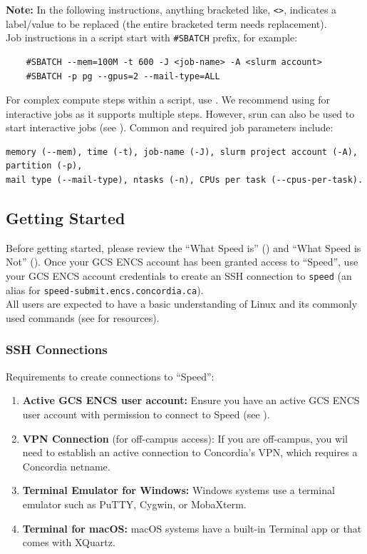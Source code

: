 \documentclass{easychair}
\begin{document}
\noindent \textbf{Note:} In the following instructions, anything bracketed like, \verb+<>+, indicates a
label/value to be replaced (the entire bracketed term needs replacement).\\

\noindent Job instructions in a script start with \verb+#SBATCH+ prefix, for example:
\begin{verbatim}
    #SBATCH --mem=100M -t 600 -J <job-name> -A <slurm account>
    #SBATCH -p pg --gpus=2 --mail-type=ALL
\end{verbatim}
%
For complex compute steps within a script, use . We recommend using  for interactive jobs as it supports multiple steps.
However, srun can also be used to start interactive jobs (see ).
%
Common and required job parameters include:
\begin{verbatim}
memory (--mem), time (-t), job-name (-J), slurm project account (-A), partition (-p), 
mail type (--mail-type), ntasks (-n), CPUs per task (--cpus-per-task).
\end{verbatim}

\subsection{Getting Started}
\label{sect:getting-started}

Before getting started, please review the ``What Speed is'' ()
and ``What Speed is Not'' ().
Once your GCS ENCS account has been granted access to ``Speed'',
use your GCS ENCS account credentials to create an SSH connection to 
\texttt{speed} (an alias for \texttt{speed-submit.encs.concordia.ca}).\\

All users are expected to have a basic understanding of
Linux and its commonly used commands (see  for resources).

\subsubsection{SSH Connections}
\label{sect:ssh}

Requirements to create connections to ``Speed'':
\begin{enumerate}
	\item \textbf{Active GCS ENCS user account:} Ensure you have an active GCS ENCS user account with 
	permission to connect to Speed (see ).
	\item \textbf{VPN Connection} (for off-campus access): If you are off-campus, you wil need to establish an active connection to Concordia's VPN, 
	which requires a Concordia netname.
	\item \textbf{Terminal Emulator for Windows:} Windows systems use a terminal emulator such as PuTTY, Cygwin, or MobaXterm.
	\item \textbf{Terminal for macOS:} macOS systems have a built-in Terminal app or  that comes with XQuartz.
\end{enumerate}
\end{document}
